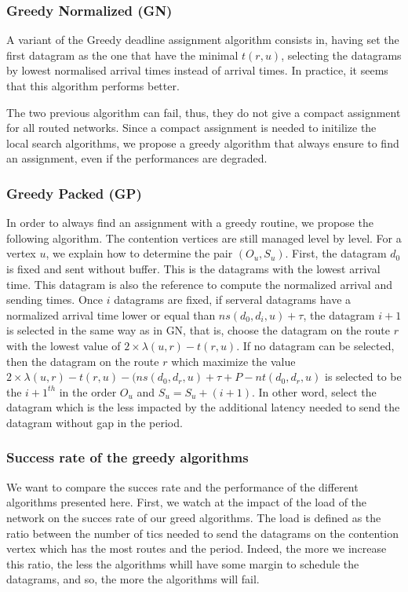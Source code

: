 \documentclass[english]{article}
\begin{document}
\subsubsection{Greedy Normalized (GN)}
A variant of the Greedy deadline assignment algorithm consists in, having set the first datagram as the one that have the minimal $t(r,u)$, selecting the datagrams by lowest normalised arrival times instead of arrival times. In practice, it seems that this algorithm performs better.

The two previous algorithm can fail, thus, they do not give a compact assignment for all routed networks. Since a compact assignment is needed to initilize the local search algorithms, we propose a greedy algorithm that always ensure to find an assignment, even if the performances are degraded.
\subsubsection{Greedy Packed (GP)}
In order to always find an assignment with a greedy routine, we propose the following algorithm.
The contention vertices are still managed level by level. For a vertex $u$, we explain how to determine the pair $(O_u,S_u)$. First, the datagram $d_0$ is fixed and sent without buffer. This is the datagrams with the lowest arrival time. This datagram is also the reference to compute the normalized arrival and sending times. Once $i$ datagrams are fixed, if serveral datagrams have a normalized arrival time lower or equal than $ns(d_0,d_i,u)+\tau$, the datagram $i+1$ is selected in the same way as in GN, that is, choose the datagram on the route $r$ with the lowest value of $2\times \lambda(u,r) - t(r,u)$. If no datagram can be selected, then the datagram on the route $r$ which maximize the value $2\times \lambda(u,r) - t(r,u) - (ns(d_0,d_r,u)+\tau+P-nt(d_0,d_r,u)$ is selected to be the $i+1^{th}$ in the order $O_u$ and $S_u = S_u + (i+1)$. In other word, select the datagram which is the less impacted by the additional latency needed to send the datagram without gap in the period.

\subsubsection{Success rate of the greedy algorithms}
We want to compare the succes rate and the performance of the different algorithms presented here.
First, we watch at the impact of the load of the network on the succes rate of our greed algorithms. The load is defined as the ratio between the number of tics needed to send the datagrams on the contention vertex which has the most routes and the period. Indeed, the more we increase this ratio, the less the algorithms whill have some margin to schedule the datagrams, and so, the more the algorithms will fail.
\end{document}

